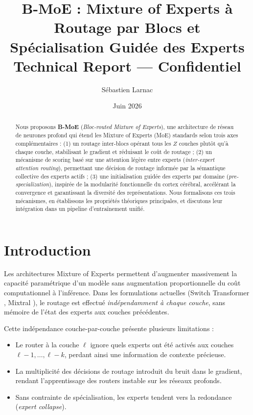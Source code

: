 \documentclass[10pt,a4paper]{article}
\title{\textbf{B-MoE : Mixture of Experts à Routage par Blocs et\\
Spécialisation Guidée des Experts}\\[0.5em]
\large Technical Report — Confidentiel}
\author{Sébastien Larnac}
\date{Juin 2026}
\begin{document}
\maketitle

\begin{abstract}
Nous proposons \textbf{B-MoE} (\textit{Bloc-routed Mixture of Experts}), une architecture de réseau de neurones profond qui étend les Mixture of Experts (MoE) standards selon trois axes complémentaires : (1) un routage inter-blocs opérant tous les $Z$ couches plutôt qu'à chaque couche, stabilisant le gradient et réduisant le coût de routage ; (2) un mécanisme de scoring basé sur une attention légère entre experts (\textit{inter-expert attention routing}), permettant une décision de routage informée par la sémantique collective des experts actifs ; (3) une initialisation guidée des experts par domaine (\textit{pre-specialization}), inspirée de la modularité fonctionnelle du cortex cérébral, accélérant la convergence et garantissant la diversité des représentations. Nous formalisons ces trois mécanismes, en établissons les propriétés théoriques principales, et discutons leur intégration dans un pipeline d'entraînement unifié.
\end{abstract}

\section{Introduction}

Les architectures Mixture of Experts \cite{shazeer2017outrageously} permettent d'augmenter massivement la capacité paramétrique d'un modèle sans augmentation proportionnelle du coût computationnel à l'inférence. Dans les formulations actuelles (Switch Transformer \cite{fedus2022switch}, Mixtral \cite{jiang2024mixtral}), le routage est effectué \textit{indépendamment à chaque couche}, sans mémoire de l'état des experts aux couches précédentes.

Cette indépendance couche-par-couche présente plusieurs limitations :
\begin{itemize}
  \item Le router à la couche $\ell$ ignore quels experts ont été activés aux couches $\ell-1, \ldots, \ell-k$, perdant ainsi une information de contexte précieuse.
  \item La multiplicité des décisions de routage introduit du bruit dans le gradient, rendant l'apprentissage des routers instable sur les réseaux profonds.
  \item Sans contrainte de spécialisation, les experts tendent vers la redondance (\textit{expert collapse}).
\end{itemize}
\end{document}
